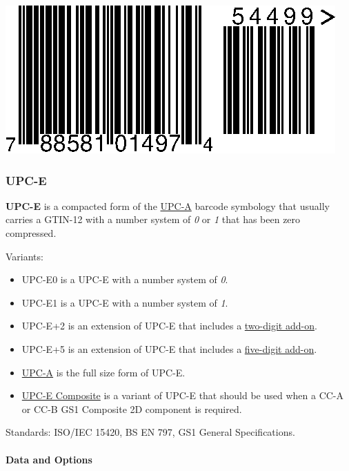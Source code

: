 \includegraphics{images/upca-2.eps}

\hypertarget{upc-e}{%
\subsubsection{UPC-E}\label{upc-e}}

\textbf{UPC-E} is a compacted form of the
\protect\hyperlink{upc-a}{UPC-A} barcode symbology that usually carries
a GTIN-12 with a number system of \emph{0} or \emph{1} that has been
zero compressed.

Variants:

\begin{itemize}
\tightlist
\item
  UPC-E0 is a UPC-E with a number system of \emph{0}.
\item
  UPC-E1 is a UPC-E with a number system of \emph{1}.
\item
  UPC-E+2 is an extension of UPC-E that includes a
  \protect\hyperlink{ean-2}{two-digit add-on}.
\item
  UPC-E+5 is an extension of UPC-E that includes a
  \protect\hyperlink{ean-5}{five-digit add-on}.
\item
  \protect\hyperlink{upc-a}{UPC-A} is the full size form of UPC-E.
\item
  \protect\hyperlink{gs1-composite-symbols}{UPC-E Composite} is a
  variant of UPC-E that should be used when a CC-A or CC-B GS1 Composite
  2D component is required.
\end{itemize}

Standards: ISO/IEC 15420, BS EN 797, GS1 General Specifications.

\hypertarget{data-and-options-3}{%
\paragraph{Data and Options}\label{data-and-options-3}}


